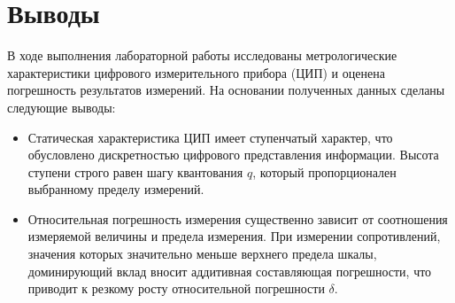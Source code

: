 \section*{Выводы}
В ходе выполнения лабораторной работы исследованы метрологические характеристики цифрового измерительного прибора (ЦИП) и оценена погрешность результатов измерений. На основании полученных данных сделаны следующие выводы:

\begin{itemize}
    \item Статическая характеристика ЦИП имеет ступенчатый характер, что обусловлено дискретностью цифрового представления информации. Высота ступени строго равен шагу квантования $q$, который пропорционален выбранному пределу измерений.
    \item Относительная погрешность измерения существенно зависит от соотношения измеряемой величины и предела измерения. При измерении сопротивлений, значения которых значительно меньше верхнего предела шкалы, доминирующий вклад вносит аддитивная составляющая погрешности, что приводит к резкому росту относительной погрешности $\delta$.
\end{itemize}